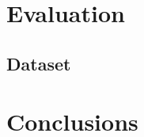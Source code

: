 \documentclass[draft,final]{vutinfth} %
\begin{document}



\chapter{Evaluation}

\section{Dataset}



\chapter{Conclusions}

\backmatter

\listoffigures %

\cleardoublepage %
\listoftables %

\listofalgorithms
{}

\printindex

\printglossaries



\end{document}
